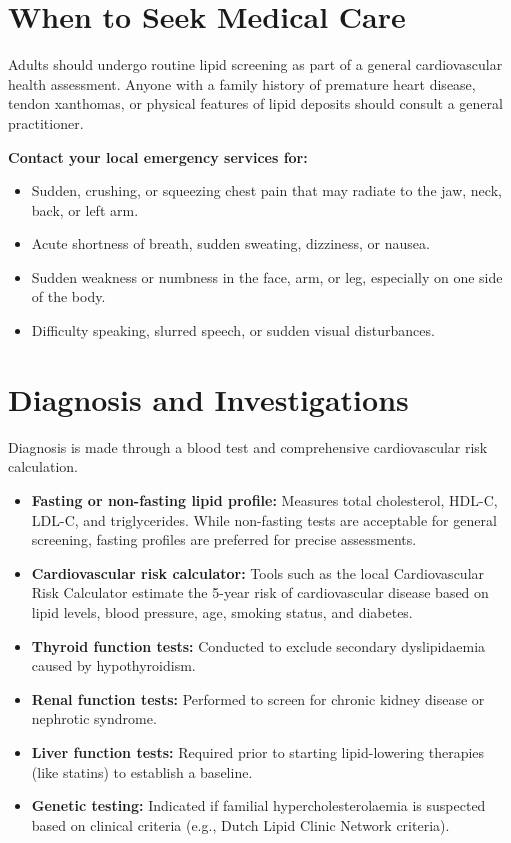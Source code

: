 \section*{When to Seek Medical Care}
Adults should undergo routine lipid screening as part of a general cardiovascular health assessment. Anyone with a family history of premature heart disease, tendon xanthomas, or physical features of lipid deposits should consult a general practitioner.

\textbf{Contact your local emergency services for:}
\begin{itemize}
    \item Sudden, crushing, or squeezing chest pain that may radiate to the jaw, neck, back, or left arm.
    \item Acute shortness of breath, sudden sweating, dizziness, or nausea.
    \item Sudden weakness or numbness in the face, arm, or leg, especially on one side of the body.
    \item Difficulty speaking, slurred speech, or sudden visual disturbances.
\end{itemize}

\section*{Diagnosis and Investigations}
Diagnosis is made through a blood test and comprehensive cardiovascular risk calculation.
\begin{itemize}
    \item \textbf{Fasting or non-fasting lipid profile:} Measures total cholesterol, HDL-C, LDL-C, and triglycerides. While non-fasting tests are acceptable for general screening, fasting profiles are preferred for precise assessments.
    \item \textbf{Cardiovascular risk calculator:} Tools such as the local Cardiovascular Risk Calculator estimate the 5-year risk of cardiovascular disease based on lipid levels, blood pressure, age, smoking status, and diabetes.
    \item \textbf{Thyroid function tests:} Conducted to exclude secondary dyslipidaemia caused by hypothyroidism.
    \item \textbf{Renal function tests:} Performed to screen for chronic kidney disease or nephrotic syndrome.
    \item \textbf{Liver function tests:} Required prior to starting lipid-lowering therapies (like statins) to establish a baseline.
    \item \textbf{Genetic testing:} Indicated if familial hypercholesterolaemia is suspected based on clinical criteria (e.g., Dutch Lipid Clinic Network criteria).
\end{itemize}

